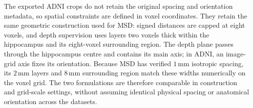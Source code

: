 \documentclass[12pt,a4paper]{article}
\begin{document}
The exported ADNI crops do not retain the original spacing and
orientation metadata, so spatial constraints are defined in voxel
coordinates. They retain the same geometric construction used for MSD:
signed distances are capped at eight voxels, and depth supervision uses
layers two voxels thick within the hippocampus and its eight-voxel
surrounding region. The depth plane passes through the hippocampus
centre and contains its main axis; in ADNI, an image-grid axis fixes
its orientation. Because MSD has verified $1\,\mathrm{mm}$ isotropic
spacing, its $2\,\mathrm{mm}$ layers and $8\,\mathrm{mm}$ surrounding
region match these widths numerically on the voxel grid. The two
formulations are therefore comparable in construction and grid-scale
settings, without assuming identical physical spacing or anatomical
orientation across the datasets.
\end{document}

